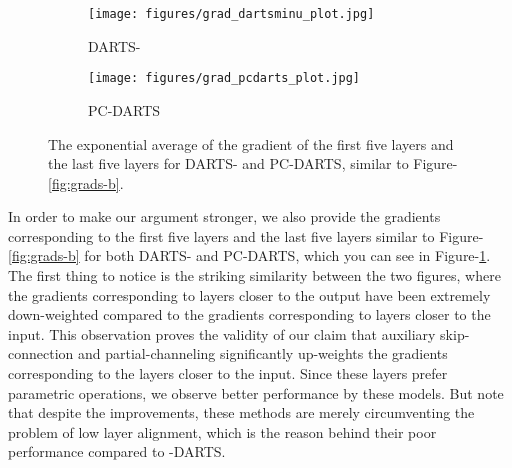 \documentclass{article} \usepackage{fancyhdr, iclr2023_conference, times}
\newcommand{\mydarts}{-DARTS\xspace}
\newcommand{\lambdafn}{layer alignment\xspace}
\begin{document}
\par \begin{figure}[t]
    \centering
    \begin{subfigure}[h]{0.5\textwidth}
        \centering
        \texttt{[image: figures/grad\_dartsminu\_plot.jpg]}
        \caption{DARTS-}
    \end{subfigure}\begin{subfigure}[h]{0.5\textwidth}
        \centering
        \texttt{[image: figures/grad\_pcdarts\_plot.jpg]}
        \caption{PC-DARTS}
    \end{subfigure}
    \caption{The exponential average of the gradient of the first five layers and the last five layers for DARTS- and PC-DARTS, similar to Figure-\ref{fig:grads-b}.}
    \label{fig:grads-dartsmin-pcdarts}
\end{figure}In order to make our argument stronger, we also provide the gradients corresponding to the first five layers and the last five layers similar to Figure-\ref{fig:grads-b} for both DARTS- and PC-DARTS, which you can see in Figure-\ref{fig:grads-dartsmin-pcdarts}. The first thing to notice is the striking similarity between the two figures, where the gradients corresponding to layers closer to the output have been extremely down-weighted compared to the gradients corresponding to layers closer to the input. This observation proves the validity of our claim that auxiliary skip-connection and partial-channeling significantly up-weights the gradients corresponding to the layers closer to the input. Since these layers prefer parametric operations, we observe better performance by these models. But note that despite the improvements, these methods are merely circumventing the problem of low \lambdafn, which is the reason behind their poor performance compared to \mydarts.
\end{document}
